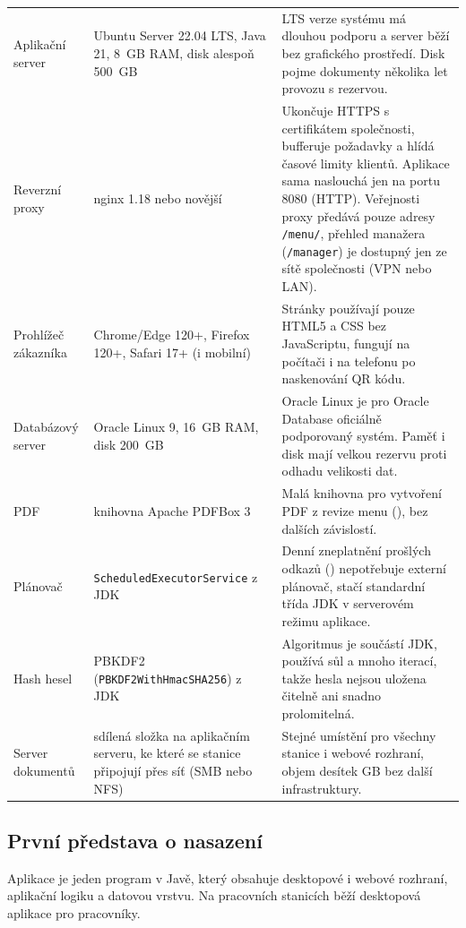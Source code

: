 {\begin{xltabular}{\textwidth}{lXX}
Aplikační server & Ubuntu Server 22.04 LTS, Java 21, 8~GB RAM, disk alespoň 500~GB & LTS verze systému má dlouhou podporu a server běží bez grafického prostředí. Disk pojme dokumenty několika let provozu s rezervou. \\
Reverzní proxy & nginx 1.18 nebo novější & Ukončuje HTTPS s certifikátem společnosti, bufferuje požadavky a hlídá časové limity klientů. Aplikace sama naslouchá jen na portu 8080 (HTTP). Veřejnosti proxy předává pouze adresy \texttt{/menu/}, přehled manažera (\texttt{/manager}) je dostupný jen ze sítě společnosti (VPN nebo LAN). \\
Prohlížeč zákazníka & Chrome/Edge 120+, Firefox 120+, Safari 17+ (i mobilní) & Stránky používají pouze HTML5 a CSS bez JavaScriptu, fungují na počítači i na telefonu po naskenování QR kódu. \\
Databázový server & Oracle Linux 9, 16~GB RAM, disk 200~GB & Oracle Linux je pro Oracle Database oficiálně podporovaný systém. Paměť i disk mají velkou rezervu proti odhadu velikosti dat. \\
PDF & knihovna Apache PDFBox 3 & Malá knihovna pro vytvoření PDF z revize menu (), bez dalších závislostí. \\
Plánovač & \texttt{ScheduledExecutorService} z JDK & Denní zneplatnění prošlých odkazů () nepotřebuje externí plánovač, stačí standardní třída JDK v serverovém režimu aplikace. \\
Hash hesel & PBKDF2 (\texttt{PBKDF2WithHmacSHA256}) z JDK & Algoritmus je součástí JDK, používá sůl a mnoho iterací, takže hesla nejsou uložena čitelně ani snadno prolomitelná. \\
Server dokumentů & sdílená složka na aplikačním serveru, ke které se stanice připojují přes síť (SMB nebo NFS) & Stejné umístění pro všechny stanice i webové rozhraní, objem desítek GB bez další infrastruktury. \\
\bottomrule
\end{xltabular}}


\subsection{První představa o nasazení}

Aplikace je jeden program v Javě, který obsahuje desktopové i webové rozhraní, aplikační logiku a datovou vrstvu. Na pracovních stanicích běží desktopová aplikace pro pracovníky.


